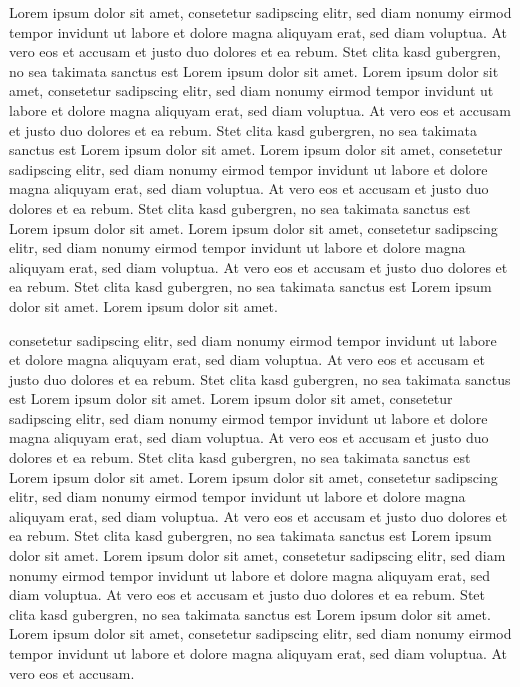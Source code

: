 \documentclass[12pt, a4paper, onecolumn]{article}
\let \footnote=\endnote %
\begin{document}
	
	Lorem ipsum dolor sit amet, consetetur sadipscing elitr, sed diam nonumy eirmod tempor invidunt ut labore et dolore magna aliquyam erat, sed diam voluptua. At vero eos et accusam et justo duo dolores et ea rebum. Stet clita kasd gubergren, no sea takimata sanctus est Lorem ipsum dolor sit amet. Lorem ipsum dolor sit amet, consetetur sadipscing elitr, sed diam nonumy eirmod tempor invidunt ut labore et dolore magna aliquyam erat, sed diam voluptua. At vero eos et accusam et justo duo dolores et ea rebum. Stet clita kasd gubergren, no sea takimata sanctus est Lorem ipsum dolor sit amet. Lorem ipsum dolor sit amet, consetetur sadipscing elitr, sed diam nonumy eirmod tempor invidunt ut labore et dolore magna aliquyam erat, sed diam voluptua.\footnote{First} At vero eos et accusam et justo duo dolores et ea rebum. Stet clita kasd gubergren, no sea takimata sanctus est Lorem ipsum dolor sit amet. Lorem ipsum dolor sit amet, consetetur sadipscing elitr, sed diam nonumy eirmod tempor invidunt ut labore et dolore magna aliquyam erat, sed diam voluptua. At vero eos et accusam et justo duo dolores et ea rebum. Stet clita kasd gubergren, no sea takimata sanctus est Lorem ipsum dolor sit amet. Lorem ipsum dolor sit amet. 
	
	consetetur sadipscing elitr, sed diam nonumy eirmod tempor invidunt ut labore et dolore magna aliquyam erat, sed diam voluptua. At vero eos et accusam et justo duo dolores et ea rebum. Stet clita kasd gubergren, no sea takimata sanctus est Lorem ipsum dolor sit amet. Lorem ipsum dolor sit amet, consetetur sadipscing elitr, sed diam nonumy eirmod tempor invidunt ut labore et dolore magna aliquyam erat, sed diam\footnote{Second} voluptua. At vero eos et accusam et justo duo dolores et ea rebum. Stet clita kasd gubergren, no sea takimata sanctus est Lorem ipsum dolor sit amet. Lorem ipsum dolor sit amet, consetetur sadipscing elitr, sed diam nonumy eirmod tempor invidunt ut labore et dolore magna aliquyam erat, sed diam voluptua. At vero eos et accusam et justo duo dolores et ea rebum. Stet clita kasd gubergren, no sea takimata sanctus est Lorem ipsum dolor sit amet. Lorem ipsum dolor sit amet, consetetur sadipscing elitr, sed diam nonumy eirmod tempor invidunt ut labore et dolore magna aliquyam erat, sed diam voluptua. At vero eos et accusam et justo duo dolores et ea rebum. Stet clita kasd gubergren, no sea takimata sanctus est Lorem ipsum dolor sit amet. Lorem ipsum dolor sit amet, consetetur sadipscing elitr, sed diam nonumy eirmod tempor invidunt ut labore et dolore magna aliquyam erat, sed diam voluptua. At vero eos et accusam. 
	
\end{document}
